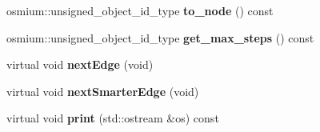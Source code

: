\begin{DoxyCompactItemize}
\item 
\hypertarget{classjustine_1_1robocar_1_1Car_aad2ce1d99d84215f9d963576d89cd777}{osmium\-::unsigned\-\_\-object\-\_\-id\-\_\-type {\bfseries to\-\_\-node} () const }\label{classjustine_1_1robocar_1_1Car_aad2ce1d99d84215f9d963576d89cd777}

\item 
\hypertarget{classjustine_1_1robocar_1_1Car_a02ff825fb44880bb7130ad1721398b27}{osmium\-::unsigned\-\_\-object\-\_\-id\-\_\-type {\bfseries get\-\_\-max\-\_\-steps} () const }\label{classjustine_1_1robocar_1_1Car_a02ff825fb44880bb7130ad1721398b27}

\item 
\hypertarget{classjustine_1_1robocar_1_1Car_a0fae4d710d8337ec1df25f00341c4e9c}{virtual void {\bfseries next\-Edge} (void)}\label{classjustine_1_1robocar_1_1Car_a0fae4d710d8337ec1df25f00341c4e9c}

\item 
\hypertarget{classjustine_1_1robocar_1_1Car_a3e0ac48e03b4307cc200d5b6a7ff7653}{virtual void {\bfseries next\-Smarter\-Edge} (void)}\label{classjustine_1_1robocar_1_1Car_a3e0ac48e03b4307cc200d5b6a7ff7653}

\item 
\hypertarget{classjustine_1_1robocar_1_1Car_a71649d538dfafc0e850fe782c55a173e}{virtual void {\bfseries print} (std\-::ostream \&os) const }\label{classjustine_1_1robocar_1_1Car_a71649d538dfafc0e850fe782c55a173e}

\end{DoxyCompactItemize}
